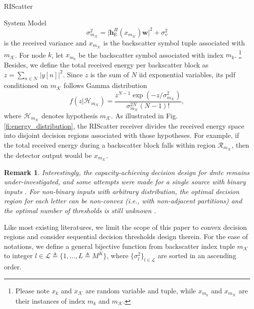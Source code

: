 \documentclass[journal]{IEEEtran}
\newtheorem{remark}{Remark}
\begin{document}
\begin{section}{RIScatter}
\begin{subsection}{System Model}
		\begin{equation}
			\sigma_{m_{\mathcal{K}}}^2 = \lvert \boldsymbol{h}_{\mathrm{E}}^H(x_{m_{\mathcal{K}}}) \boldsymbol{w} \rvert^2 + \sigma_v^2
			\label{eq:receive_variance}
		\end{equation}
		is the received variance and $x_{m_\mathcal{K}}$ is the backscatter symbol tuple associated with $m_{\mathcal{K}}$.
		For node $k$, let $x_{m_k}$ be the backscatter symbol associated with index $m_k$.%
		\footnote{
			Please note $x_k$ and $x_{\mathcal{K}}$ are random variable and tuple, while $x_{m_k}$ and $x_{m_{\mathcal{K}}}$ are their instances of index $m_k$ and $m_{\mathcal{K}}$.
		}
		Besides, we define the total received energy per backscatter block as $z=\sum_{n \in \mathcal{N}} \lvert y[n] \rvert^2$.
		Since $z$ is the sum of $N$ \gls{iid} exponential variables, its \gls{pdf} conditioned on $m_{\mathcal{K}}$ follows Gamma distribution
		\begin{equation}
			f(z|\mathcal{H}_{m_{\mathcal{K}}}) = \frac{z^{N-1} \exp(-z/\sigma_{m_{\mathcal{K}}}^2)}{\sigma_{m_{\mathcal{K}}}^{2N} (N-1)!},
			\label{eq:energy_distribution}
		\end{equation}
		where $\mathcal{H}_{m_{\mathcal{K}}}$ denotes hypothesis $m_{\mathcal{K}}$.
		As illustrated in Fig. \ref{fi:energy_distribution}, the RIScatter receiver divides the received energy space into disjoint decision regions associated with those hypotheses.
		For example, if the total received energy during a backscatter block falls within region $\mathcal{R}_{m_{\mathcal{K}}}$, then the detector output would be $x_{m_{\mathcal{K}}}$.
		\begin{remark}
			Interestingly, the capacity-achieving decision design for \gls{dmtc} remains under-investigated, and some attempts were made for a single source with binary inputs \cite{Qian2019b,Nguyen2021b}.
			For non-binary inputs with arbitrary distribution, the optimal decision region for each letter can be non-convex (i.e., with non-adjacent partitions) and the optimal number of thresholds is still unknown \cite{Nguyen2018,Nguyen2021}.
		\end{remark}
		Like most existing literatures, we limit the scope of this paper to convex decision regions and consider sequential decision thresholds design therein.
		For the ease of notations, we define a general bijective function from backscatter index tuple $m_{\mathcal{K}}$ to integer $l \in \mathcal{L} \triangleq \{1,\ldots,L \triangleq M^K\}$, where $\{\sigma_l^2\}_{l \in \mathcal{L}}$ are sorted in an ascending order.

\end{subsection}
\end{section}
\end{document}

